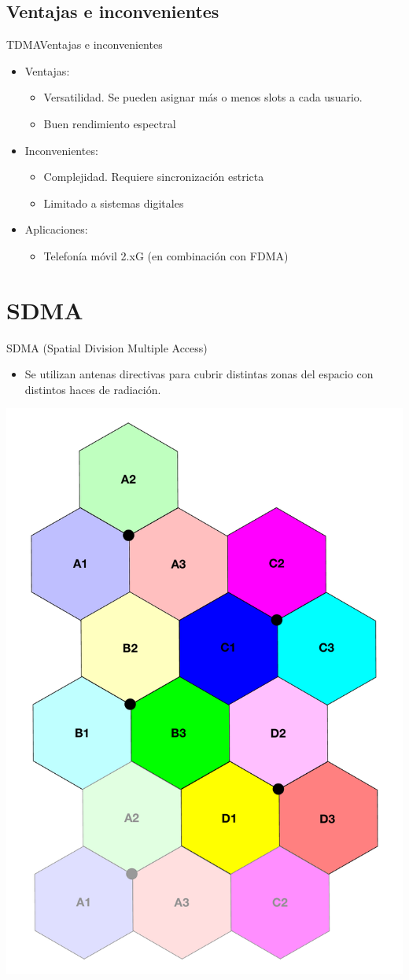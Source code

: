 \documentclass[10pt,compress]{beamer} %
\begin{document}
\subsection{Ventajas e inconvenientes}
\begin{frame}{TDMA}{Ventajas e inconvenientes}
  \begin{itemize}
    \item Ventajas:
      \begin{itemize}
        \item Versatilidad. Se pueden asignar más o menos slots a cada usuario. 
        \item Buen rendimiento espectral
      \end{itemize}
    \item Inconvenientes:
      \begin{itemize}
        \item Complejidad. Requiere sincronización estricta
        \item Limitado a sistemas digitales
      \end{itemize}
    \item Aplicaciones:
      \begin{itemize}
        \item Telefonía móvil 2.xG (en combinación con FDMA)
      \end{itemize}
  \end{itemize}
\end{frame}


\section{SDMA}
\begin{frame}{SDMA (Spatial Division Multiple Access)}
  \begin{itemize}
    \item Se utilizan antenas directivas para cubrir distintas zonas del espacio con distintos haces de radiación.
  \end{itemize}
  \centering \includegraphics[width=0.4\linewidth]{../Apuntes/Figuras/SDMA.pdf}
\end{frame}
\end{document}
